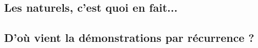 \subsection{Les naturels, c'est quoi en fait...}




\subsection{D'où vient la démonstrations par récurrence ?}





